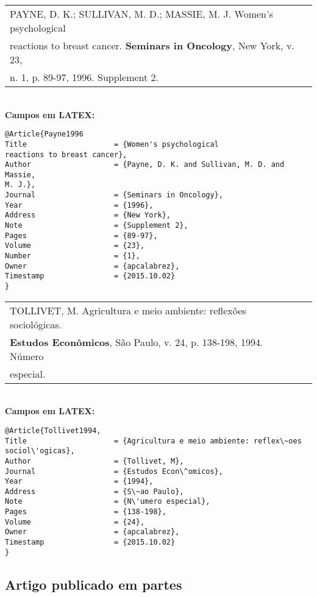 \begin{tabular}{|l|c|} \hline
	PAYNE, D. K.; SULLIVAN, M. D.; MASSIE, M. J. Women's psychological \\ reactions to breast cancer. \textbf{Seminars in Oncology},  New York, v. 23, \\n. 1, p. 89-97, 1996. Supplement 2.
	\\\hline
\end{tabular} \\

\textbf{Campos em LATEX:} 

\begin{verbatim}
@Article{Payne1996
Title                    = {Women's psychological
reactions to breast cancer},
Author                   = {Payne, D. K. and Sullivan, M. D. and Massie, 
M. J.},
Journal                  = {Seminars in Oncology},
Year                     = {1996},
Address                  = {New York},
Note                     = {Supplement 2},
Pages                    = {89-97},
Volume                   = {23},
Number                   = {1},
Owner                    = {apcalabrez},
Timestamp                = {2015.10.02}
}
\end{verbatim}

\begin{tabular}{|l|c|} \hline
	TOLLIVET, M. Agricultura e meio ambiente: reflex\~oes sociol\'ogicas. \\\textbf{Estudos Econ\^omicos},  S\~ao Paulo, v. 24, p. 138-198, 1994. N\'umero \\especial. 
	\\\hline
\end{tabular} \\

\textbf{Campos em LATEX:} 

\begin{verbatim}
@Article{Tollivet1994,
Title                    = {Agricultura e meio ambiente: reflex\~oes 
sociol\'ogicas},
Author                   = {Tollivet, M},
Journal                  = {Estudos Econ\^omicos},
Year                     = {1994},
Address                  = {S\~ao Paulo},
Note                     = {N\'umero especial},
Pages                    = {138-198},
Volume                   = {24},
Owner                    = {apcalabrez},
Timestamp                = {2015.10.02}
}
\end{verbatim}

\subsection{Artigo publicado em partes}

